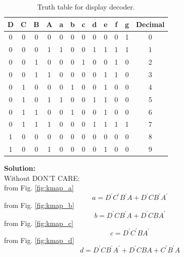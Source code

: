 \documentclass[journal,12pt,twocolumn]{IEEEtran}
\begin{document}
\begin{enumerate}
	\begin{table}[h!]
	\begin{center}
		\begin{tabular}{ |c|c|c|c|c|c|c|c|c|c|c|c| } 
			\hline
			D & C & B & A & \textbf{a} & \textbf{b} & \textbf{c} & \textbf{d} & \textbf{e} & \textbf{f} & \textbf{g} & Decimal \\ 
			\hline
			0 & 0 & 0 & 0 & 0 & 0 & 0 & 0 & 0 & 0 & 1 & 0 \\ 
			\hline
			0 & 0 & 0 & 1 & 1 & 0 & 0 & 1 & 1 & 1 & 1 & 1 \\ 
			\hline
			0 & 0 & 1 & 0 & 0 & 0 & 1 & 0 & 0 & 1 & 0 & 2 \\ 
			\hline
			0 & 0 & 1 & 1 & 0 & 0 & 0 & 0 & 1 & 1 & 0 & 3 \\
			\hline
			0 & 1 & 0 & 0 & 0 & 1 & 0 & 0 & 1 & 0 & 0 & 4 \\
			\hline
			0 & 1 & 0 & 1 & 1 & 0 & 0 & 1 & 1 & 0 & 0 & 5 \\
			\hline
			0 & 1 & 1 & 0 & 0 & 1 & 0 & 0 & 1 & 0 & 0 & 6 \\ 
			\hline
			0 & 1 & 1 & 1 & 0 & 0 & 0 & 1 & 1 & 1 & 1 & 7 \\
			\hline
			1 & 0 & 0 & 0 & 0 & 0 & 0 & 0 & 0 & 0 & 0 & 8 \\
			\hline
			1 & 0 & 0 & 1 & 0 & 0 & 0 & 0 & 1 & 0 & 0 & 9 \\ 
			\hline
		\end{tabular}
		\caption{Truth table for display decoder.}
		\label{table:disp_dec}
	\end{center}
\end{table}
\end{enumerate}
\textbf{Solution:}\\
Without DON'T CARE: \\
from Fig. \ref{fig:kmap_a}
\begin{equation}
	a = D^{\prime}C^{\prime}B^{\prime}A+D^{\prime}CB^{\prime}A^{\prime}
\end{equation}
from Fig. \ref{fig:kmap_b}
\begin{equation}
	b = D^{\prime}CB^{\prime}A+D^{\prime}CBA^{\prime}
\end{equation}
from Fig.  \ref{fig:kmap_c}
\begin{equation}
	c = D^{\prime}C^{\prime}BA^{\prime}
\end{equation}
from Fig. \ref{fig:kmap_d}
\begin{equation}
	d = D^{\prime}CB^{\prime}A^{\prime}+D^{\prime}CBA+C^{\prime}B^{\prime}A
\end{equation}
\end{document}
